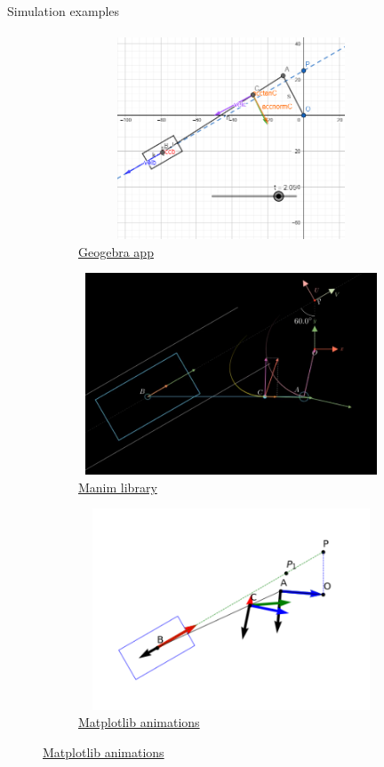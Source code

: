 \documentclass[aspectratio=169]{beamer}
\begin{document}
    \begin{frame}[t]{Simulation examples}
    \framesubtitle{}
        \begin{figure}[H]
            \begin{subfigure}{0.32\textwidth}
                \centering\includegraphics[height=6cm,width=1\textwidth,keepaspectratio]{geo.png}
                \caption{\href{https://www.geogebra.org/}{Geogebra app}}
                \label{fig:geo.png}
            \end{subfigure}
            \begin{subfigure}{0.32\textwidth}
                \centering\includegraphics[height=6cm,width=1\textwidth,keepaspectratio]{manim.png}
                \caption{\href{https://www.manim.community/}{Manim library}}
                \label{fig:manim.png}
            \end{subfigure}
            \begin{subfigure}{0.32\textwidth}
                \centering\includegraphics[height=6cm,width=1\textwidth,keepaspectratio]{matplotlib.png}
                \caption{\href{https://matplotlib.org/stable/users/explain/animations/animations.html\#sphx-glr-users-explain-animations-animations-py}{Matplotlib animations}}
                \label{fig:matplotlib.png}
            \end{subfigure}
        

\end{figure}
\end{frame}
\end{document}
